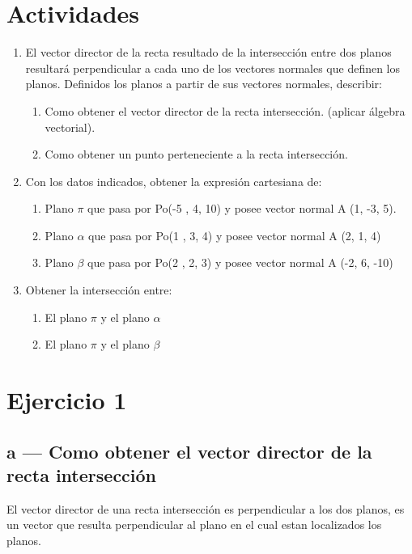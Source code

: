 \documentclass{article}
\begin{document}
\section{Actividades}
	\begin{enumerate}
		\item El vector director de la recta resultado de la intersección entre dos planos resultará
			perpendicular a cada uno de los vectores normales que definen los planos.
			Definidos los planos a partir de sus vectores normales, describir:
			\begin{enumerate}[label=\alph*.]
				\item Como obtener el vector director de la recta intersección. (aplicar álgebra vectorial).
				\item Como obtener un punto perteneciente a la recta intersección.
			\end{enumerate}
		\item Con los datos indicados, obtener la expresión cartesiana de:
			\begin{enumerate}[label=\alph*.]
				\item Plano $\pi$ que pasa por Po(-5 , 4, 10) y posee vector normal A (1, -3, 5).
				\item Plano $\alpha$ que pasa por Po(1 , 3, 4) y posee vector normal A (2, 1, 4)
				\item Plano $\beta$ que pasa por Po(2 , 2, 3) y posee vector normal A (-2, 6, -10)
			\end{enumerate}
		\item Obtener la intersección entre:
			\begin{enumerate}[label=\alph*.]
				\item El plano $\pi$ y el plano $\alpha$
				\item El plano $\pi$ y el plano $\beta$ 
			\end{enumerate}

	\end{enumerate}



\section{Ejercicio 1}
	\subsection{a --- Como obtener el vector director de la recta intersección}
		El vector director de una recta intersección es perpendicular a los dos planos, es un vector que resulta perpendicular
		al plano en el cual estan localizados los planos.
\end{document}
